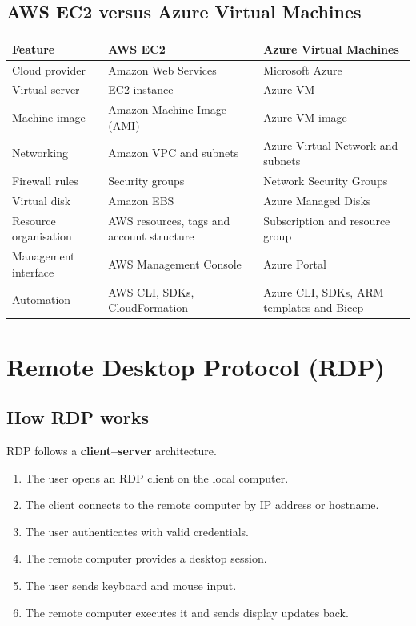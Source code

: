 \documentclass[11pt,a4paper]{article}
\begin{document}
\subsection{AWS EC2 versus Azure Virtual Machines}

\begin{tabularx}{\textwidth}{@{}lXX@{}}
\toprule
\rowcolor{tablehead}\textbf{Feature} & \textbf{AWS EC2} & \textbf{Azure Virtual Machines} \\
\midrule
Cloud provider & Amazon Web Services & Microsoft Azure \\
Virtual server & EC2 instance & Azure VM \\
Machine image & Amazon Machine Image (AMI) & Azure VM image \\
Networking & Amazon VPC and subnets & Azure Virtual Network and subnets \\
Firewall rules & Security groups & Network Security Groups \\
Virtual disk & Amazon EBS & Azure Managed Disks \\
Resource organisation & AWS resources, tags and account structure & Subscription and resource
  group \\
Management interface & AWS Management Console & Azure Portal \\
Automation & AWS CLI, SDKs, CloudFormation & Azure CLI, SDKs, ARM templates and Bicep \\
\bottomrule
\end{tabularx}

\section{Remote Desktop Protocol (RDP)}


\subsection{How RDP works}

RDP follows a \textbf{client--server} architecture.


\begin{enumerate}\itemsep2pt
  \item The user opens an RDP client on the local computer.
  \item The client connects to the remote computer by IP address or hostname.
  \item The user authenticates with valid credentials.
  \item The remote computer provides a desktop session.
  \item The user sends keyboard and mouse input.
  \item The remote computer executes it and sends display updates back.
\end{enumerate}
\end{document}
